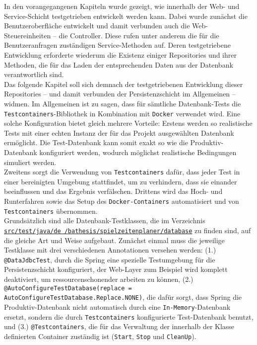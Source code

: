 
In den vorangegangenen Kapiteln wurde gezeigt, wie innerhalb der Web- und 
Service-Schicht testgetrieben entwickelt werden kann. Dabei wurde zunächst die 
Benutzeroberfläche entwickelt und damit verbunden auch die Web-Steuereinheiten -- 
die Controller. Diese rufen unter anderem die für die Benutzeranfragen zuständigen 
Service-Methoden auf. Deren testgetriebene Entwicklung erforderte wiederum die Existenz 
einiger Repositories und ihrer Methoden, die für das Laden der entsprechenden Daten aus 
der Datenbank verantwortlich sind. \\ 
Das folgende Kapitel soll sich demnach der testgetriebenen Entwicklung dieser 
Repositories -- und damit verbunden der Persistenzschicht im Allgemeinen -- widmen.
Im Allgemeinen ist zu sagen, dass für sämtliche Datenbank-Tests die 
\texttt{Testcontainers}-Bibliothek in Kombination mit \texttt{Docker} verwendet wird. 
Eine solche Konfiguration bietet gleich mehrere Vorteile: Erstens werden so 
realistische Tests mit einer echten Instanz der für das Projekt ausgewählten 
Datenbank ermöglicht. Die Test-Datenbank kann somit exakt so wie die 
Produktiv-Datenbank konfiguriert werden, wodurch möglichst realistische Bedingungen 
simuliert werden. \\ 
Zweitens sorgt die Verwendung von \texttt{Testcontainers} dafür, dass jeder Test in 
einer bereinigten Umgebung stattfindet, um zu verhindern, dass sie einander 
beeinflussen und das Ergebnis verfälschen. Drittens wird das Hoch- und Runterfahren 
sowie das Setup des \texttt{Docker-Containers} automatisiert und von 
\texttt{Testcontainers} übernommen. \\ 
Grundsätzlich sind alle Datenbank-Testklassen, die im Verzeichnis 
\href{https://github.com/FlorianOhmes/bat_spielzeitenplaner/tree/main/spielzeitenplaner/src/test/java/de/bathesis/spielzeitenplaner/database}{\texttt{src/test/java/de \linebreak /bathesis/spielzeitenplaner/database}}
zu finden sind, auf die gleiche Art und Weise aufgebaut. Zunächst einmal muss die 
jeweilige Testklasse mit drei verschiedenen Annotationen versehen werden: 
(1.) \texttt{@DataJdbcTest}, durch die Spring eine spezielle Testumgebung für die 
Persistenzschicht konfiguriert, der Web-Layer zum Beispiel wird komplett deaktiviert, 
um ressourcenschonender arbeiten zu können, (2.) 
\texttt{@AutoConfigureTestDatabase(replace = AutoConfigureTestDatabase.Replace.NONE)}, 
die dafür sorgt, dass Spring die Produktiv-Datenbank nicht automatisch durch eine 
\texttt{In-Memory}-Datenbank ersetzt, sondern die durch \texttt{Testcontainers} 
konfigurierte Test-Datenbank benutzt, und (3.) \texttt{@Testcontainers}, die für das 
Verwaltung der innerhalb der Klasse definierten Container zuständig ist 
(\texttt{Start}, \texttt{Stop} und \texttt{CleanUp}). 

